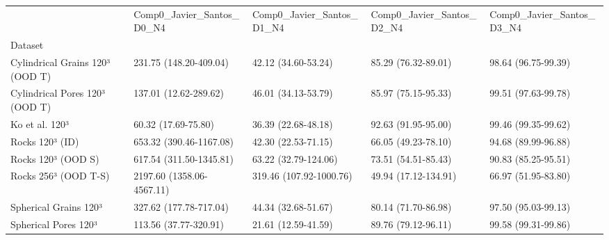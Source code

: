\begin{tabular}{lllll}
\toprule
 & Comp0_Javier_Santos_D0_N4 & Comp0_Javier_Santos_D1_N4 & Comp0_Javier_Santos_D2_N4 & Comp0_Javier_Santos_D3_N4 \\
Dataset &  &  &  &  \\
\midrule
Cylindrical Grains 120³ (OOD T) & 231.75 (148.20-409.04) & 42.12 (34.60-53.24) & 85.29 (76.32-89.01) & 98.64 (96.75-99.39) \\
Cylindrical Pores 120³ (OOD T) & 137.01 (12.62-289.62) & 46.01 (34.13-53.79) & 85.97 (75.15-95.33) & 99.51 (97.63-99.78) \\
Ko et al. 120³ & 60.32 (17.69-75.80) & 36.39 (22.68-48.18) & 92.63 (91.95-95.00) & 99.46 (99.35-99.62) \\
Rocks 120³ (ID) & 653.32 (390.46-1167.08) & 42.30 (22.53-71.15) & 66.05 (49.23-78.10) & 94.68 (89.99-96.88) \\
Rocks 120³ (OOD S) & 617.54 (311.50-1345.81) & 63.22 (32.79-124.06) & 73.51 (54.51-85.43) & 90.83 (85.25-95.51) \\
Rocks 256³ (OOD T-S) & 2197.60 (1358.06-4567.11) & 319.46 (107.92-1000.76) & 49.94 (17.12-134.91) & 66.97 (51.95-83.80) \\
Spherical Grains 120³ & 327.62 (177.78-717.04) & 44.34 (32.68-51.67) & 80.14 (71.70-86.98) & 97.50 (95.03-99.13) \\
Spherical Pores 120³ & 113.56 (37.77-320.91) & 21.61 (12.59-41.59) & 89.76 (79.12-96.11) & 99.58 (99.31-99.86) \\
\bottomrule
\end{tabular}
